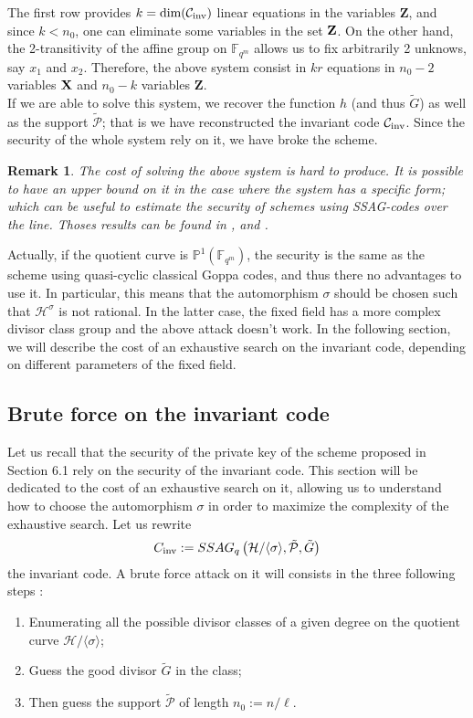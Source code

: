 \documentclass[10pt]{article}
\newtheorem{rq1}{Remark}[]
\newcommand{\s}{\vspace{0.3cm}}
\newcommand{\fqm}{\mathbb{F}_{q^m}}
\newcommand{\PR}{\mathcal{P}}
\begin{document}
The first row provides $k=\rm dim(\mathcal{C}_{\rm{inv}})$ linear equations in the variables $\textbf{Z}$, and since $k < n_0$, one can eliminate some variables in the set $\bf{Z}$. On the other hand, the 2-transitivity of the affine group on $\fqm$ allows us to fix arbitrarily 2 unknows, say $x_1$ and $x_2$. Therefore, the above system consist in $kr$ equations in $n_0-2$ variables $\bf{X}$ and $n_0-k$ variables $\textbf{Z}$. \\
If we are able to solve this system, we recover the function $h$ (and thus $\tilde{G}$) as well as the support $\tilde{\PR}$; that is we have reconstructed the invariant code $\mathcal{C}_{\rm inv}$. Since the security of the whole system rely on it, we have broke the scheme.  

\s

\begin{rq1} \rm
The cost of solving the above system is hard to produce. It is possible to have an upper bound on it in the case where the system has a specific form; which can be useful to estimate the security of schemes using SSAG-codes over the line. Thoses results can be found in \cite{FOP}, \cite{FOP1} and \cite{FOP2}. 
\end{rq1}

Actually, if the quotient curve is $\mathbb{P}^1(\fqm)$, the security is the same as the scheme using quasi-cyclic classical Goppa codes, and thus there no advantages to use it. In particular, this means that the automorphism $\sigma$ should be chosen such that $\mathcal{H}^{\sigma}$ is not rational. In the latter case, the fixed field has a more complex divisor class group and the above attack doesn't work. In the following section, we will describe the cost of an exhaustive search on the invariant code, depending on different parameters of the fixed field.

\s

\subsection{Brute force on the invariant code}

\s

Let us recall that the security of the private key of the scheme proposed in Section 6.1 rely on the security of the invariant code. This section will be dedicated to the cost of an exhaustive search on it, allowing us to understand how to choose the automorphism $\sigma$ in order to maximize the complexity of the exhaustive search. Let us rewrite 
\[C_{\rm inv} := SSAG_q\left(\mathcal{H}/\langle \sigma \rangle,\tilde{\PR},\tilde{G}\right)\]
the invariant code. A brute force attack on it will consists in the three following steps :
\begin{enumerate}
\item Enumerating all the possible divisor classes of a given degree on the quotient curve $\mathcal{H}/\langle \sigma \rangle$;
\item Guess the good divisor $\tilde{G}$ in the class;
\item Then guess the support $\tilde{\PR}$ of length $n_0:=n/\ell$.
\end{enumerate}
\end{document}
